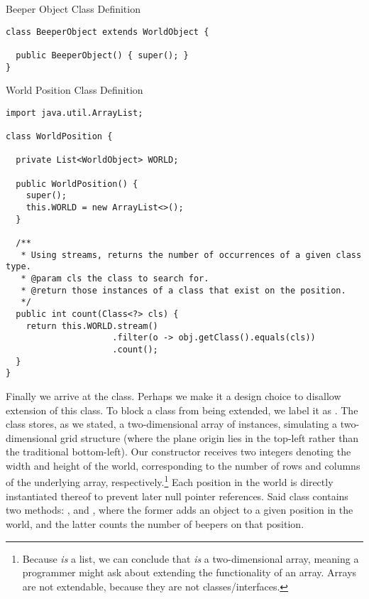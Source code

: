 \begin{cl}{Beeper Object Class Definition}
\begin{lstlisting}[language=MyJava]
class BeeperObject extends WorldObject {
  
  public BeeperObject() { super(); }
}
\end{lstlisting}
\end{cl}

\begin{cl}{World Position Class Definition}
\begin{lstlisting}[language=MyJava]
import java.util.ArrayList;

class WorldPosition {

  private List<WorldObject> WORLD;

  public WorldPosition() { 
    super(); 
    this.WORLD = new ArrayList<>();  
  }

  /**
   * Using streams, returns the number of occurrences of a given class type.
   * @param cls the class to search for.
   * @return those instances of a class that exist on the position.
   */
  public int count(Class<?> cls) {
    return this.WORLD.stream()
                     .filter(o -> obj.getClass().equals(cls))
                     .count();
  }
}
\end{lstlisting}
\end{cl}

Finally we arrive at the  class. Perhaps we make it a design choice to disallow extension of this class. To block a class from being extended, we label it as . The  class stores, as we stated, a two-dimensional array of  instances, simulating a two-dimensional grid structure (where the plane origin lies in the top-left rather than the traditional bottom-left). Our constructor receives two integers denoting the width and height of the world, corresponding to the number of rows and columns of the underlying array, respectively.\footnote{Because  \textit{is} a list, we can conclude that  \textit{is} a two-dimensional array, meaning a programmer might ask about extending the functionality of an array. Arrays are not extendable, because they are not classes/interfaces.} Each position in the world is directly instantiated thereof to prevent later null pointer references. Said  class contains two methods: , and , where the former adds an object to a given position in the world, and the latter counts the number of beepers on that position.

